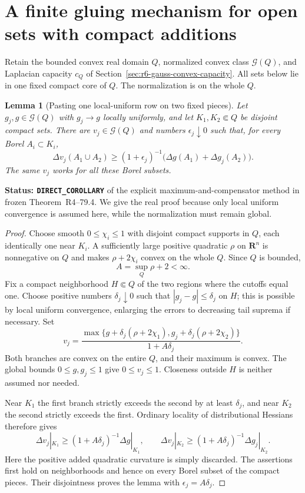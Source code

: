 \documentclass[11pt,a4paper]{article}
\numberwithin{equation}{section}
\newtheorem{lemma}[theorem]{Lemma}
\theoremstyle{definition}
\theoremstyle{remark}
\begin{document}


\section{A finite gluing mechanism for open sets with compact additions}
\label{sec:r6-gauss-open-compact}

Retain the bounded convex real domain $Q$, normalized convex class
$\mathcal G(Q)$, and Laplacian capacity $c_Q$ of
Section~\ref{sec:r6-gauss-convex-capacity}. All sets below lie in one
fixed compact core of $Q$. The normalization is on the whole $Q$.

\begin{lemma}[Pasting one local-uniform row on two fixed pieces]
\label{lem:r6-convex-local-uniform-pasting}
Let $g_j,g\in\mathcal G(Q)$ with $g_j\to g$ locally uniformly, and
let $K_1,K_2\Subset Q$ be disjoint compact sets. There are
$v_j\in\mathcal G(Q)$ and numbers $\epsilon_j\downarrow0$ such that,
for every Borel $A_i\subset K_i$,
\[
 \Delta v_j(A_1\cup A_2)
    \ge(1+\epsilon_j)^{-1}
                        \bigl(\Delta g(A_1)+\Delta g_j(A_2)\bigr).
\]
The same $v_j$ works for all these Borel subsets.
\end{lemma}

\noindent\textbf{Status: \texttt{DIRECT\_COROLLARY}} of the
explicit maximum-and-compensator method in frozen
Theorem~\textup{R4--79.4}. We give the real proof
because only local uniform convergence is assumed here, while the
normalization must remain global.

\begin{proof}
Choose smooth $0\le\chi_i\le1$ with disjoint compact supports in
$Q$, each identically one near $K_i$. A sufficiently large positive
quadratic $\rho$ on $\mathbf R^n$ is nonnegative on $Q$ and makes
$\rho+2\chi_i$ convex on the whole $Q$. Since $Q$ is bounded,
\[
                         A=\sup_Q\rho+2<\infty.
\]
Fix a compact neighborhood $H\Subset Q$ of the two regions where
the cutoffs equal one. Choose positive numbers $\delta_j\downarrow0$
such that $|g_j-g|\le\delta_j$ on $H$; this is possible by local
uniform convergence, enlarging the errors to decreasing tail suprema
if necessary. Set
\[
 v_j=\frac{\max\{g+\delta_j(\rho+2\chi_1),
                       g_j+\delta_j(\rho+2\chi_2)\}}
                  {1+A\delta_j}.
\]
Both branches are convex on the entire $Q$, and their maximum is
convex. The global bounds $0\le g,g_j\le1$ give $0\le v_j\le1$.
Closeness outside $H$ is neither assumed nor needed.

Near $K_1$ the first branch strictly exceeds the second by at least
$\delta_j$, and near $K_2$ the second strictly exceeds the first.
Ordinary locality of distributional Hessians therefore gives
\[
 \Delta v_j|_{K_1}
       \ge(1+A\delta_j)^{-1}\Delta g|_{K_1},\qquad
 \Delta v_j|_{K_2}
       \ge(1+A\delta_j)^{-1}\Delta g_j|_{K_2}.
\]
Here the positive added quadratic curvature is simply discarded.
The assertions first hold on neighborhoods and hence on every Borel
subset of the compact pieces. Their disjointness proves the lemma
with $\epsilon_j=A\delta_j$.
\end{proof}
\end{document}
